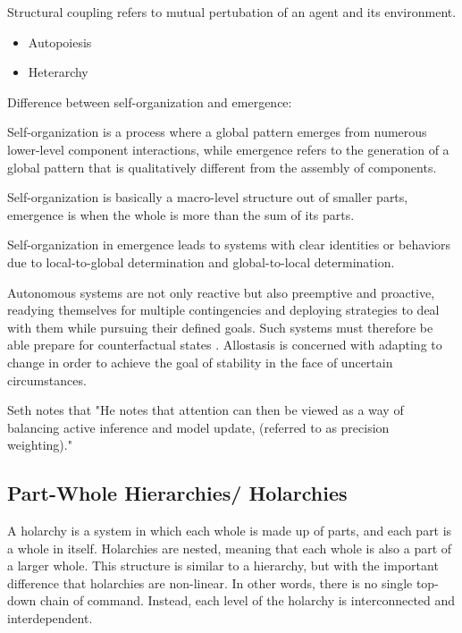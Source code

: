 Structural coupling refers to mutual pertubation of an agent and its environment.


\begin{itemize}
    \item Autopoiesis
    \item Heterarchy
\end{itemize}


Difference between self-organization and emergence:

Self-organization is a process where a global pattern emerges from numerous lower-level component interactions, while emergence refers to the generation of a global pattern that is qualitatively different from the assembly of components.

Self-organization is basically a macro-level structure out of smaller parts, emergence is when the whole is more than the sum of its parts.

Self-organization in emergence leads to systems with clear identities or behaviors due to local-to-global determination and global-to-local determination.


Autonomous systems are not only reactive but also preemptive and proactive, readying themselves for multiple contingencies and deploying strategies to deal with them while pursuing their defined goals. 
Such systems must therefore be able prepare for counterfactual states . 
Allostasis is concerned with adapting to change in order to achieve the goal of stability in the face of uncertain circumstances. 

Seth notes that "He notes that attention can then be viewed as a way of balancing active inference and model update, (referred to as precision weighting)."

\subsection{Part-Whole Hierarchies/ Holarchies}

A holarchy is a system in which each whole is made up of parts, and each part is a whole in itself. Holarchies are nested, meaning that each whole is also a part of a larger whole. This structure is similar to a hierarchy, but with the important difference that holarchies are non-linear. In other words, there is no single top-down chain of command. Instead, each level of the holarchy is interconnected and interdependent.

